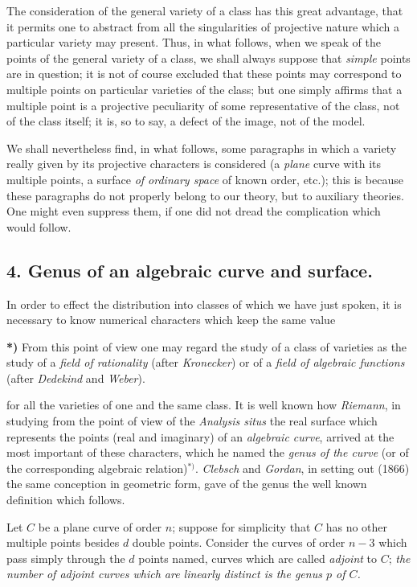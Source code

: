 \documentclass{article}
\begin{document}
The consideration of the general variety of a class has this great advantage, that it permits one to abstract from all the singularities of projective nature which a particular variety may present. Thus, in what follows, when we speak of the points of the general variety of a class, we shall always suppose that \emph{simple} points are in question; it is not of course excluded that these points may correspond to multiple points on particular varieties of the class; but one simply affirms that a multiple point is a projective peculiarity of some representative of the class, not of the class itself; it is, so to say, a defect of the image, not of the model.

We shall nevertheless find, in what follows, some paragraphs in which a variety really given by its projective characters is considered (a \emph{plane} curve with its multiple points, a surface \emph{of ordinary space} of known order, etc.); this is because these paragraphs do not properly belong to our theory, but to auxiliary theories. One might even suppress them, if one did not dread the complication which would follow.

\subsection*{4. Genus of an algebraic curve and surface.}

In order to effect the distribution into classes of which we have just spoken, it is necessary to know numerical characters which keep the same value

\textbf{*)} From this point of view one may regard the study of a class of varieties as the study of a \emph{field of rationality} (after \emph{Kronecker}) or of a \emph{field of algebraic functions} (after \emph{Dedekind} and \emph{Weber}).

for all the varieties of one and the same class. It is well known how \emph{Riemann}, in studying from the point of view of the \emph{Analysis situs} the real surface which represents the points (real and imaginary) of an \emph{algebraic curve}, arrived at the most important of these characters, which he named the \emph{genus of the curve} (or of the corresponding algebraic relation)${}^{*)}$. \emph{Clebsch} and \emph{Gordan}, in setting out (1866) the same conception in geometric form, gave of the genus the well known definition which follows.

Let $C$ be a plane curve of order $n$; suppose for simplicity that $C$ has no other multiple points besides $d$ double points. Consider the curves of order $n-3$ which pass simply through the $d$ points named, curves which are called \emph{adjoint} to $C$; \emph{the number of adjoint curves which are linearly distinct is the genus $p$ of $C$.}
\end{document}
